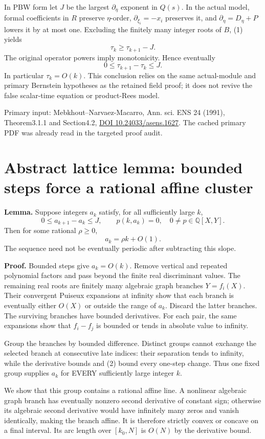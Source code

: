 \documentclass{article}
\newcommand{\Q}{\mathbb Q}\newcommand{\Z}{\mathbb Z}\newcommand{\N}{\mathbb N}
\begin{document}
In PBW form let $J$ be the largest $\partial_\eta$ exponent in $Q(s)$. In the actual model, formal coefficients in $R$ preserve $\eta$-order, $\partial_{\xi_i}=-x_i$ preserves it, and $\partial_\eta=D_\eta+P$ lowers it by at most one. Excluding the finitely many integer roots of $B$, (1) yields
\[
 \tau_k\ge\tau_{k+1}-J.
\]
The original operator powers imply monotonicity. Hence eventually
\[
                  0\le\tau_{k+1}-\tau_k\le J.              \tag{2}
\]
In particular $\tau_k=O(k)$. This conclusion relies on the same actual-module and primary Bernstein hypotheses as the retained field proof; it does not revive the false scalar-time equation or product-Rees model.

Primary input: Mebkhout--Narvaez-Macarro, Ann. sci. ENS 24 (1991), Theorem3.1.1 and Section4.2, \href{https://doi.org/10.24033/asens.1627}{DOI 10.24033/asens.1627}. The cached primary PDF was already read in the targeted proof audit.

\section{Abstract lattice lemma: bounded steps force a rational affine cluster}
\textbf{Lemma.} Suppose integers $a_k$ satisfy, for all sufficiently large $k$,
\[
 0\le a_{k+1}-a_k\le J,\qquad p(k,a_k)=0,
 \quad 0\ne p\in\Q[X,Y].
\]
Then for some rational $\rho\ge0$,
\[
                         a_k=\rho k+O(1).                \tag{3}
\]
The sequence need not be eventually periodic after subtracting this slope.

\textbf{Proof.} Bounded steps give $a_k=O(k)$. Remove vertical and repeated polynomial factors and pass beyond the finite real discriminant values. The remaining real roots are finitely many algebraic graph branches $Y=f_i(X)$. Their convergent Puiseux expansions at infinity show that each branch is eventually either $O(X)$ or outside the range of $a_k$. Discard the latter branches. The surviving branches have bounded derivatives. For each pair, the same expansions show that $f_i-f_j$ is bounded or tends in absolute value to infinity.

Group the branches by bounded difference. Distinct groups cannot exchange the selected branch at consecutive late indices: their separation tends to infinity, while the derivative bounds and (2) bound every one-step change. Thus one fixed group supplies $a_k$ for EVERY sufficiently large integer $k$.

We show that this group contains a rational affine line. A nonlinear algebraic graph branch has eventually nonzero second derivative of constant sign; otherwise its algebraic second derivative would have infinitely many zeros and vanish identically, making the branch affine. It is therefore strictly convex or concave on a final interval. Its arc length over $[k_0,N]$ is $O(N)$ by the derivative bound.
\end{document}
